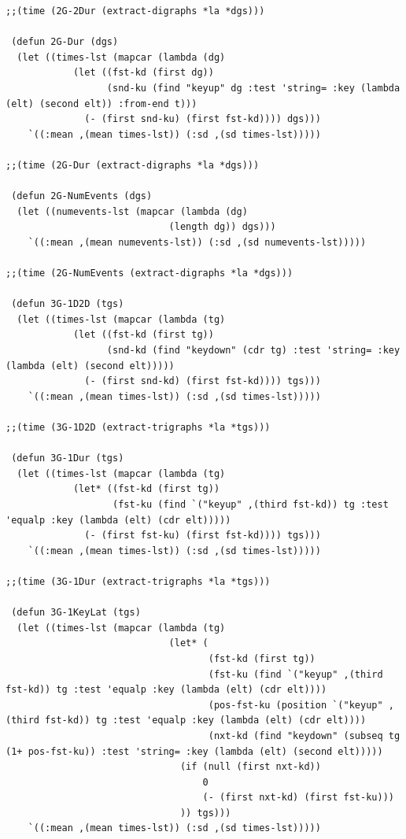 \begin{lstlisting}[frame=single]
;;(time (2G-2Dur (extract-digraphs *la *dgs)))

 (defun 2G-Dur (dgs)
  (let ((times-lst (mapcar (lambda (dg)
            (let ((fst-kd (first dg))
                  (snd-ku (find "keyup" dg :test 'string= :key (lambda (elt) (second elt)) :from-end t)))
              (- (first snd-ku) (first fst-kd)))) dgs)))
    `((:mean ,(mean times-lst)) (:sd ,(sd times-lst)))))

;;(time (2G-Dur (extract-digraphs *la *dgs)))

 (defun 2G-NumEvents (dgs)
  (let ((numevents-lst (mapcar (lambda (dg)
                             (length dg)) dgs)))
    `((:mean ,(mean numevents-lst)) (:sd ,(sd numevents-lst)))))

;;(time (2G-NumEvents (extract-digraphs *la *dgs)))

 (defun 3G-1D2D (tgs)
  (let ((times-lst (mapcar (lambda (tg)
            (let ((fst-kd (first tg))
                  (snd-kd (find "keydown" (cdr tg) :test 'string= :key (lambda (elt) (second elt)))))
              (- (first snd-kd) (first fst-kd)))) tgs)))
    `((:mean ,(mean times-lst)) (:sd ,(sd times-lst)))))

;;(time (3G-1D2D (extract-trigraphs *la *tgs)))

 (defun 3G-1Dur (tgs)
  (let ((times-lst (mapcar (lambda (tg)
            (let* ((fst-kd (first tg))
                   (fst-ku (find `("keyup" ,(third fst-kd)) tg :test 'equalp :key (lambda (elt) (cdr elt)))))
              (- (first fst-ku) (first fst-kd)))) tgs)))
    `((:mean ,(mean times-lst)) (:sd ,(sd times-lst)))))

;;(time (3G-1Dur (extract-trigraphs *la *tgs)))

 (defun 3G-1KeyLat (tgs)
  (let ((times-lst (mapcar (lambda (tg)
                             (let* (
                                    (fst-kd (first tg))
                                    (fst-ku (find `("keyup" ,(third fst-kd)) tg :test 'equalp :key (lambda (elt) (cdr elt))))
                                    (pos-fst-ku (position `("keyup" ,(third fst-kd)) tg :test 'equalp :key (lambda (elt) (cdr elt))))
                                    (nxt-kd (find "keydown" (subseq tg (1+ pos-fst-ku)) :test 'string= :key (lambda (elt) (second elt)))))
                               (if (null (first nxt-kd))
                                   0
                                   (- (first nxt-kd) (first fst-ku)))
                               )) tgs)))
    `((:mean ,(mean times-lst)) (:sd ,(sd times-lst)))))


\end{lstlisting}
